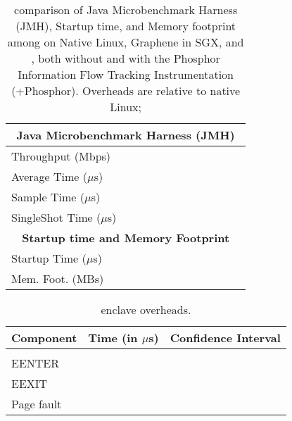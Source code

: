 \begin{table}[t!b!]
\begin{tabular}{|l|rr|rrr|rrr|rrr|}
				\hline
				\multicolumn{12}{|c|}{{\bf Java Microbenchmark Harness (JMH)}}\\
				\hline
				Throughput (Mbps)&  &  &  &  &  &  &  &  &  &  &  \\
				Average Time (\footnotesize $\mu$s)&  &  &  &  &  &  &  &  &  &  &  \\
				Sample Time (\footnotesize $\mu$s)&  &  &  &  &  &  &  &  &  &  &  \\
				SingleShot Time (\footnotesize $\mu$s)&  &  &  &  &  &  &  &  &  &  &  \\				
				\hline
				\multicolumn{12}{|c|}{{\bf Startup time and Memory Footprint}}\\
				\hline
				Startup Time (\footnotesize $\mu$s)&  &  &  &  &  &  &  &  &  &  &  \\
				Mem. Foot. (MBs)&  &  &  &  &  &  &  &  &  &  &  \\
				\hline
%
			\end{tabular}
			\caption{comparison of Java Microbenchmark Harness (JMH), Startup time, and Memory footprint
			among \java{} on Native Linux, Graphene in SGX, and \sysname{}, both without and with the Phosphor Information Flow Tracking Instrumentation (+Phosphor).
				Overheads are relative to native Linux; 
			}
			\label{tab:perf}
		\end{table}


\begin{table}[t!b!]
	\footnotesize
	\centering
	\begin{tabular}{lrr}
		\hline
		{\bf Component} & {\bf Time (in \footnotesize $\mu$s)} & {\bf Confidence Interval}\\
		\hline\\
		EENTER &  &  \\
		EEXIT &  &  \\
		Page fault &  &  \\
		\hline
	\end{tabular}
	\caption{\sgx{} enclave overheads.}
	\label{tab:sgx}
\end{table}


